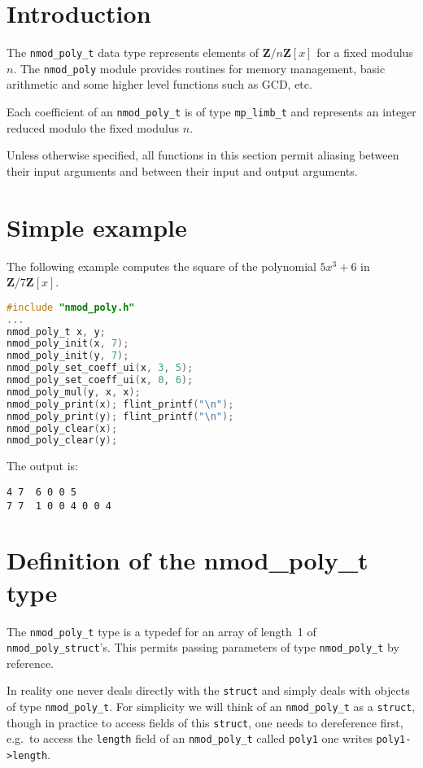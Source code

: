 \documentclass[a4paper,10pt]{book}
\newcommand{\Z}{\mathbf{Z}}%
\newcommand{\code}{\lstinline}
\begin{document}
{{\section{Introduction}

The \code{nmod_poly_t} data type represents elements of $\Z/n\Z[x]$ for
a fixed modulus $n$. The \code{nmod_poly} module provides routines for
memory management, basic arithmetic and some higher level functions
such as GCD, etc.

Each coefficient of an \code{nmod_poly_t} is of type \code{mp_limb_t}
and represents an integer reduced modulo the fixed modulus $n$.

Unless otherwise specified, all functions in this section permit aliasing
between their input arguments and between their input and output arguments.

\section{Simple example}

The following example computes the square of the polynomial $5x^3 + 6$
in $\Z/7\Z[x]$.
\begin{lstlisting}[language=c]
#include "nmod_poly.h"
...
nmod_poly_t x, y;
nmod_poly_init(x, 7);
nmod_poly_init(y, 7);
nmod_poly_set_coeff_ui(x, 3, 5);
nmod_poly_set_coeff_ui(x, 0, 6);
nmod_poly_mul(y, x, x);
nmod_poly_print(x); flint_printf("\n");
nmod_poly_print(y); flint_printf("\n");
nmod_poly_clear(x);
nmod_poly_clear(y);
\end{lstlisting}

The output is:
\begin{lstlisting}
4 7  6 0 0 5
7 7  1 0 0 4 0 0 4
\end{lstlisting}

\section{Definition of the nmod\_poly\_t type}

The \code{nmod_poly_t} type is a typedef for an array of length~1 of
\code{nmod_poly_struct}'s.  This permits passing parameters of type
\code{nmod_poly_t} by reference.

In reality one never deals directly with the \code{struct} and simply deals
with objects of type \code{nmod_poly_t}.  For simplicity we will think of an
\code{nmod_poly_t} as a \code{struct}, though in practice to access fields
of this \code{struct}, one needs to dereference first, e.g.\ to access the
\code{length} field of an \code{nmod_poly_t} called \code{poly1} one writes
\code{poly1->length}.

}}
\end{document}
